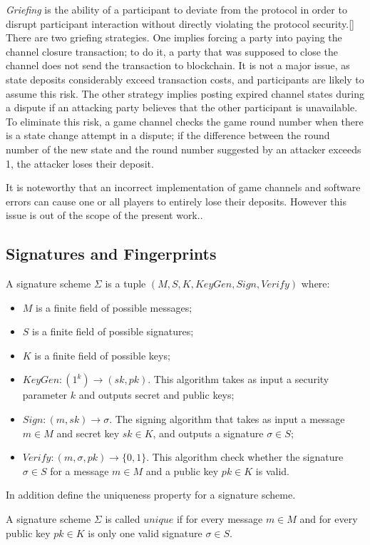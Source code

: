 \textit {Griefing} is the ability of a participant to deviate from the protocol in order to disrupt participant interaction without directly violating the protocol security.[] There are two griefing strategies. One implies forcing a party into paying the channel closure transaction; to do it, a party that was supposed to close the channel does not send the transaction to blockchain. It is not a major issue, as state deposits considerably exceed transaction costs, and participants are likely to assume this risk. The other strategy implies posting expired channel states during a dispute if an attacking party believes that the other participant is unavailable. To eliminate this risk, a game channel checks the game round number when there is a state change attempt in a dispute; if the difference between the round number of the new state and the round number suggested by an attacker exceeds 1, the attacker loses their deposit.

It is noteworthy that an incorrect implementation of game channels and software errors can cause one or all players to entirely lose their deposits. However this issue is out of the scope of the present work..

	\subsection{Signatures and Fingerprints}
\begin{defn}
A signature scheme $ \Sigma $ is a tuple $(M, S, K, KeyGen, Sign, Verify)$ where:
	\begin{itemize}
		\item $ M $ is a finite field of possible messages;
		\item $ S $ is a finite field of possible signatures;
		\item $ K $ is a finite field of possible keys;
		\item $ KeyGen: (1^k) \rightarrow (sk, pk) $. This algorithm takes as input a security parameter $k$ and outputs secret and public keys;
		\item $Sign: (m, sk) \rightarrow \sigma $. The signing algorithm that takes as input a message $m \in M$ and secret key $sk \in K$, and outputs a signature $\sigma \in S$;
	\item $Verify: (m, \sigma, pk) \rightarrow \{0, 1\} $. This algorithm check whether the signature $\sigma \in S$ for a message $m \in M$ and a public key $pk \in K$ is valid.
	\end{itemize}
\end{defn}
In addition define the uniqueness property for a signature scheme. 
\begin{defn}
A signature scheme $ \Sigma $ is called $unique$ if for every message $m \in M$ and for every public key $pk \in K$ is only one valid signature $\sigma \in S$.
\end{defn}

